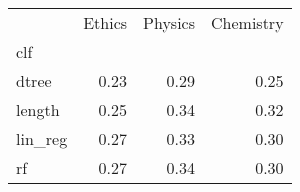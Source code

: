 \begin{tabular}{lrrr}
\toprule
{} &  Ethics &  Physics &  Chemistry \\
clf     &         &          &            \\
\midrule
dtree   &    0.23 &     0.29 &       0.25 \\
length  &    0.25 &     0.34 &       0.32 \\
lin\_reg &    0.27 &     0.33 &       0.30 \\
rf      &    0.27 &     0.34 &       0.30 \\
\bottomrule
\end{tabular}
